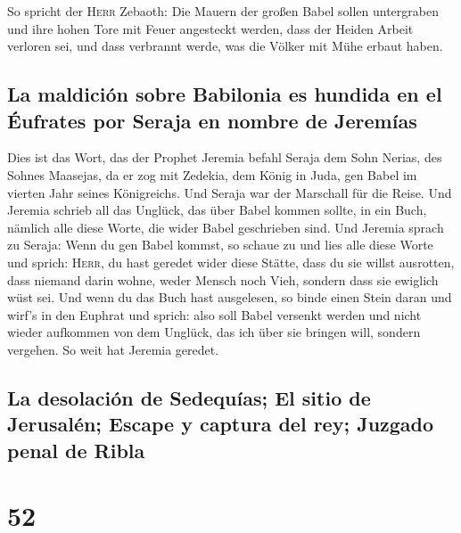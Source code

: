  So spricht der \textsc{Herr} Zebaoth: Die Mauern der
großen Babel sollen untergraben und ihre hohen Tore mit Feuer angesteckt
werden, dass der Heiden Arbeit verloren sei, und dass verbrannt werde,
was die Völker mit Mühe erbaut haben.

\hypertarget{la-maldiciuxf3n-sobre-babilonia-es-hundida-en-el-uxe9ufrates-por-seraja-en-nombre-de-jeremuxedas}{%
\subsection{La maldición sobre Babilonia es hundida en el Éufrates por
Seraja en nombre de
Jeremías}\label{la-maldiciuxf3n-sobre-babilonia-es-hundida-en-el-uxe9ufrates-por-seraja-en-nombre-de-jeremuxedas}}

 Dies ist das Wort, das der Prophet Jeremia befahl Seraja
dem Sohn Nerias, des Sohnes Maasejas, da er zog mit Zedekia, dem König
in Juda, gen Babel im vierten Jahr seines Königreichs. Und Seraja war
der Marschall für die Reise.  Und Jeremia schrieb all das
Unglück, das über Babel kommen sollte, in ein Buch, nämlich alle diese
Worte, die wider Babel geschrieben sind.  Und Jeremia
sprach zu Seraja: Wenn du gen Babel kommst, so schaue zu und lies alle
diese Worte  und sprich: \textsc{Herr}, du hast geredet
wider diese Stätte, dass du sie willst ausrotten, dass niemand darin
wohne, weder Mensch noch Vieh, sondern dass sie ewiglich wüst sei.
 Und wenn du das Buch hast ausgelesen, so binde einen
Stein daran und wirf's in den Euphrat  und sprich: also
soll Babel versenkt werden und nicht wieder aufkommen von dem Unglück,
das ich über sie bringen will, sondern vergehen. So weit hat Jeremia
geredet.

\hypertarget{la-desolaciuxf3n-de-sedequuxedas-el-sitio-de-jerusaluxe9n-escape-y-captura-del-rey-juzgado-penal-de-ribla}{%
\subsection{La desolación de Sedequías; El sitio de Jerusalén; Escape y
captura del rey; Juzgado penal de
Ribla}\label{la-desolaciuxf3n-de-sedequuxedas-el-sitio-de-jerusaluxe9n-escape-y-captura-del-rey-juzgado-penal-de-ribla}}

\hypertarget{section-51}{%
\section{52}\label{section-51}}

